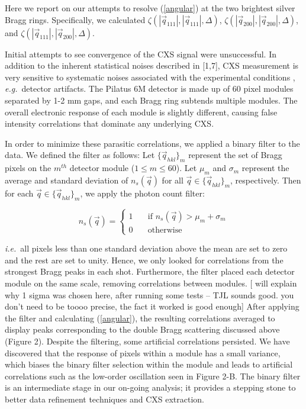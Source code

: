 \documentclass [11pt,fleqn]{article}
\begin{document}
Here we report on our attempts to resolve (\ref{angular}) at the two brightest silver Bragg rings. Specifically, we calculated $\zeta (|\vec{q}_{111}|,|\vec{q}_{111}|, \Delta  )$, $\zeta (|\vec{q}_{200}|,|\vec{q}_{200}|, \Delta  )$, and $\zeta (|\vec{q}_{111}|,|\vec{q}_{200}|, \Delta  )$. 

Initial attempts to see convergence of the CXS signal were unsuccessful. In addition to the inherent statistical noises described in [1,7], CXS measurement  is very sensitive to systematic noises associated with the experimental conditions \cite{Kam:1981ua}, \textit{e.g.}~detector artifacts. The Pilatus 6M detector is made up of 60 pixel modules separated by 1-2 mm gaps, and each Bragg ring subtends multiple modules. The overall electronic response of each module is slightly different, causing false intensity correlations that dominate any underlying CXS. 

In order to minimize these parasitic correlations, we applied a binary filter to the data. We defined the filter as follows: Let $\{ \vec{q}_{hkl} \}_{m}$ represent the set of Bragg pixels on the $m^{th}$ detector module ($1 \leq m \leq 60$). Let $\mu_m$ and $\sigma_m$ represent the average and standard deviation of $n_{s}(\vec{q})$  for all $\vec{q} \in \{ \vec{q}_{hkl} \}_{m} $, respectively. Then for each $\vec{q} \in \{ \vec{q}_{hkl} \}_{m} $, we apply the photon count filter:

\[  n_{s}(\vec{q} ) = 
 \begin{cases} 
   1 & \quad \text{if } n_{s}(\vec{q} ) > \mu_m +  \sigma_m\\
   0 & \quad \text{otherwise} 
 \end{cases} 
 \]

\textit{i.e.}~all pixels less than one standard deviation above the mean are set to zero and the rest are set to unity. Hence, we only looked for correlations from the strongest Bragg peaks in each shot. Furthermore, the filter placed each detector module on the same scale, removing correlations between modules. [  will explain why 1 sigma was chosen here, after running some tests -- TJL sounds good. you don't need to be toooo precise, the fact it worked is good enough]  After applying the filter and calculating (\ref{angular}), the resulting correlations averaged to display peaks corresponding to the double Bragg scattering discussed above (Figure 2). Despite the filtering, some artificial correlations persisted. We have discovered that the response of pixels within a module has a small variance,  which biases the binary filter selection within the module and leads to artificial correlations such as the low-order oscillation seen in Figure 2-B. The binary filter is an intermediate stage in our on-going analysis; it provides a stepping stone to better data refinement techniques and CXS extraction.
\end{document}
